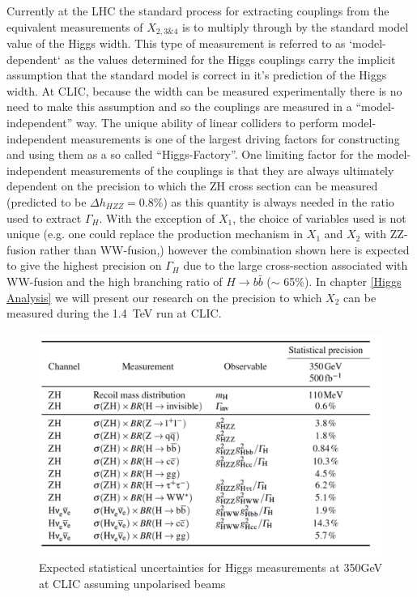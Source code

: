Currently at the LHC the standard process for extracting couplings from the equivalent measurements of $X_{2,3\&4}$ is to multiply through by the standard model value of the Higgs width. This type of measurement is referred to as `model-dependent` as the values determined for the Higgs couplings carry the implicit assumption that the standard model is correct in it's prediction of the Higgs width. At CLIC, because the width can be measured experimentally there is no need to make this assumption and so the couplings are measured in a ``model-independent'' way. The unique ability of linear colliders to perform model-independent measurements is one of the largest driving factors for constructing and using them as a so called ``Higgs-Factory''. One limiting factor for the model-independent measurements of the couplings is that they are always ultimately dependent on the precision to which the ZH cross section can be measured (predicted to be $\Delta h_{HZZ} = 0.8\%$) as this quantity is always needed in the ratio used to extract $\Gamma_H$. With the exception of $X_1$, the choice of variables used is not unique (e.g. one could replace the production mechanism in $X_1$ and $X_2$ with ZZ-fusion rather than WW-fusion,) however the combination shown here is expected to give the highest precision on $\Gamma_H$ due to the large cross-section associated with WW-fusion and the high branching ratio of $H\rightarrow b\bar{b}$ ($\sim$ 65\%). In chapter \ref{Higgs Analysis} we will present our research on the precision to which $X_2$ can be measured during the 1.4~TeV run at CLIC.

\begin{figure}
  \centering
  \includegraphics[width=0.7\linewidth]{Theory/fig/table28_350GeVPrecisions}
  \caption[Expected statistical uncertainties for Higgs measurements at 350GeV at CLIC assuming unpolarised beams]{Expected statistical uncertainties for Higgs measurements at 350GeV at CLIC assuming unpolarised beams}
  \label{fig:350GeVNumbers}
\end{figure}

